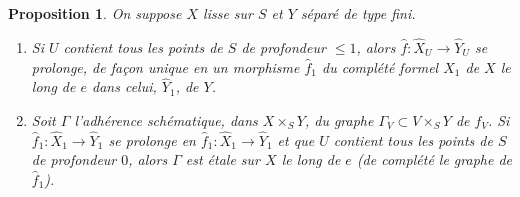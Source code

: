 \documentclass[12pt,a4paper]{article}
\theoremstyle{plain}
\newtheorem{proposition}[theorem]{Proposition}
\theoremstyle{definition}
\theoremstyle{remark}
\begin{document}
\begin{proposition}
On suppose $X$ lisse sur $S$ et $Y$ séparé de type fini.

\begin{enumerate}[label=(\roman*)]
\item Si $U$ contient tous les points de $S$ de profondeur $\leq 1$, alors $\hat{f} : \hat{X}_U \to \hat{Y}_U$ se prolonge, de façon unique en un morphisme $\hat{f}_1$ du complété formel $\hat{X}_1$ de $X$ le long de $e$ dans celui, $\hat{Y}_1$, de $Y$.
\item Soit $\Gamma$ l'adhérence schématique, dans $X \times_S Y$, du graphe $\Gamma_V \subset V \times_S Y$ de $f_V$. Si $\hat{f}_1 : \hat{X}_1 \to \hat{Y}_1$ se prolonge en $\hat{f}_1 : \hat{X}_1 \to \hat{Y}_1$ et que $U$ contient tous les points de $S$ de profondeur $0$, alors $\Gamma$ est étale sur $X$ le long de $e$ (de complété le graphe de $\hat{f}_1$).
\end{enumerate}
\end{proposition}
\end{document}
